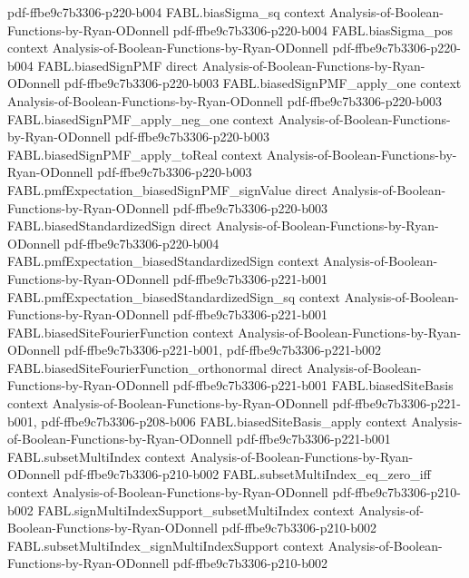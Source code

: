\begin{theorem}
  {pdf-ffbe9c7b3306-p220-b004}
\proofstep
  {FABL.biasSigma_sq}
  {context}
  {Analysis-of-Boolean-Functions-by-Ryan-ODonnell}
  {pdf-ffbe9c7b3306-p220-b004}
\proofstep
  {FABL.biasSigma_pos}
  {context}
  {Analysis-of-Boolean-Functions-by-Ryan-ODonnell}
  {pdf-ffbe9c7b3306-p220-b004}
\proofstep
  {FABL.biasedSignPMF}
  {direct}
  {Analysis-of-Boolean-Functions-by-Ryan-ODonnell}
  {pdf-ffbe9c7b3306-p220-b003}
\proofstep
  {FABL.biasedSignPMF_apply_one}
  {context}
  {Analysis-of-Boolean-Functions-by-Ryan-ODonnell}
  {pdf-ffbe9c7b3306-p220-b003}
\proofstep
  {FABL.biasedSignPMF_apply_neg_one}
  {context}
  {Analysis-of-Boolean-Functions-by-Ryan-ODonnell}
  {pdf-ffbe9c7b3306-p220-b003}
\proofstep
  {FABL.biasedSignPMF_apply_toReal}
  {context}
  {Analysis-of-Boolean-Functions-by-Ryan-ODonnell}
  {pdf-ffbe9c7b3306-p220-b003}
\proofstep
  {FABL.pmfExpectation_biasedSignPMF_signValue}
  {direct}
  {Analysis-of-Boolean-Functions-by-Ryan-ODonnell}
  {pdf-ffbe9c7b3306-p220-b003}
\proofstep
  {FABL.biasedStandardizedSign}
  {direct}
  {Analysis-of-Boolean-Functions-by-Ryan-ODonnell}
  {pdf-ffbe9c7b3306-p220-b004}
\proofstep
  {FABL.pmfExpectation_biasedStandardizedSign}
  {context}
  {Analysis-of-Boolean-Functions-by-Ryan-ODonnell}
  {pdf-ffbe9c7b3306-p221-b001}
\proofstep
  {FABL.pmfExpectation_biasedStandardizedSign_sq}
  {context}
  {Analysis-of-Boolean-Functions-by-Ryan-ODonnell}
  {pdf-ffbe9c7b3306-p221-b001}
\proofstep
  {FABL.biasedSiteFourierFunction}
  {context}
  {Analysis-of-Boolean-Functions-by-Ryan-ODonnell}
  {pdf-ffbe9c7b3306-p221-b001,
    pdf-ffbe9c7b3306-p221-b002}
\proofstep
  {FABL.biasedSiteFourierFunction_orthonormal}
  {direct}
  {Analysis-of-Boolean-Functions-by-Ryan-ODonnell}
  {pdf-ffbe9c7b3306-p221-b001}
\proofstep
  {FABL.biasedSiteBasis}
  {context}
  {Analysis-of-Boolean-Functions-by-Ryan-ODonnell}
  {pdf-ffbe9c7b3306-p221-b001,
    pdf-ffbe9c7b3306-p208-b006}
\proofstep
  {FABL.biasedSiteBasis_apply}
  {context}
  {Analysis-of-Boolean-Functions-by-Ryan-ODonnell}
  {pdf-ffbe9c7b3306-p221-b001}
\proofstep
  {FABL.subsetMultiIndex}
  {context}
  {Analysis-of-Boolean-Functions-by-Ryan-ODonnell}
  {pdf-ffbe9c7b3306-p210-b002}
\proofstep
  {FABL.subsetMultiIndex_eq_zero_iff}
  {context}
  {Analysis-of-Boolean-Functions-by-Ryan-ODonnell}
  {pdf-ffbe9c7b3306-p210-b002}
\proofstep
  {FABL.signMultiIndexSupport_subsetMultiIndex}
  {context}
  {Analysis-of-Boolean-Functions-by-Ryan-ODonnell}
  {pdf-ffbe9c7b3306-p210-b002}
\proofstep
  {FABL.subsetMultiIndex_signMultiIndexSupport}
  {context}
  {Analysis-of-Boolean-Functions-by-Ryan-ODonnell}
  {pdf-ffbe9c7b3306-p210-b002}

\end{theorem}
